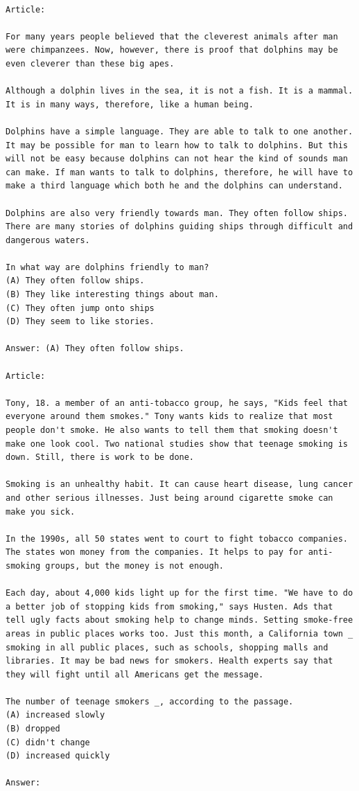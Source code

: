 \documentclass[11pt, a4paper, logo, internal, copyright, nonumbering]{deepmind}
\begin{document}
{
\footnotesize
\begin{verbatim}

Article:

For many years people believed that the cleverest animals after man were chimpanzees. Now, however, there is proof that dolphins may be even cleverer than these big apes.

Although a dolphin lives in the sea, it is not a fish. It is a mammal. It is in many ways, therefore, like a human being.

Dolphins have a simple language. They are able to talk to one another. It may be possible for man to learn how to talk to dolphins. But this will not be easy because dolphins can not hear the kind of sounds man can make. If man wants to talk to dolphins, therefore, he will have to make a third language which both he and the dolphins can understand.

Dolphins are also very friendly towards man. They often follow ships. There are many stories of dolphins guiding ships through difficult and dangerous waters.

In what way are dolphins friendly to man?
(A) They often follow ships.
(B) They like interesting things about man.
(C) They often jump onto ships
(D) They seem to like stories.

Answer: (A) They often follow ships.

Article:

Tony, 18. a member of an anti-tobacco group, he says, "Kids feel that everyone around them smokes." Tony wants kids to realize that most people don't smoke. He also wants to tell them that smoking doesn't make one look cool. Two national studies show that teenage smoking is down. Still, there is work to be done.

Smoking is an unhealthy habit. It can cause heart disease, lung cancer and other serious illnesses. Just being around cigarette smoke can make you sick.

In the 1990s, all 50 states went to court to fight tobacco companies. The states won money from the companies. It helps to pay for anti-smoking groups, but the money is not enough.

Each day, about 4,000 kids light up for the first time. "We have to do a better job of stopping kids from smoking," says Husten. Ads that tell ugly facts about smoking help to change minds. Setting smoke-free areas in public places works too. Just this month, a California town _ smoking in all public places, such as schools, shopping malls and libraries. It may be bad news for smokers. Health experts say that they will fight until all Americans get the message.

The number of teenage smokers _, according to the passage.
(A) increased slowly
(B) dropped
(C) didn't change
(D) increased quickly

Answer:

\end{verbatim}
}
\end{document}
